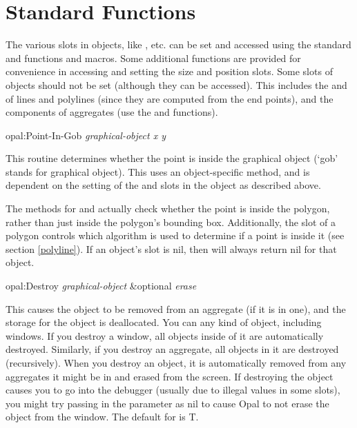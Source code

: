 \section{Standard Functions}

\label{stdfuncs}
The various slots in objects, like , etc. can be set and accessed using the standard
 and  functions and macros.  Some additional
functions are provided for convenience in accessing and setting the size
and position slots.  Some slots of objects should not be set (although they can
be accessed).  This includes the  and 
of lines and polylines (since they are computed from the end points), and
the components of aggregates (use the  and
 functions).

\vspace{1 line}
\begin{programexample}
opal:Point-In-Gob {\it graphical-object x y}\value{method}
\end{programexample}

This routine determines whether the point  is inside the
graphical object (`gob' stands for graphical object).  This uses an
object-specific method, and is dependent on the setting of the
 and  slots in the object
as described above.

The  methods for  and 
actually check whether the point is inside the polygon, rather than just
inside the polygon's bounding box.  Additionally, the 
slot of a polygon controls which algorithm is used to determine if a point
is inside it (see section \ref{polyline}).
If an object's  slot is {\sc nil}, then 
will always return {\sc nil} for that object.

\vspace{1 line}
\begin{programexample}
opal:Destroy {\it graphical-object} \&optional {\it erase}\value{method}
\end{programexample}

This causes the object to be removed from an aggregate (if it is in one),
and the storage for the object is deallocated.
You can  any kind of object, including windows.  If you destroy
a window, all objects inside of it are automatically destroyed.  Similarly,
if you destroy an aggregate, all objects in it are destroyed (recursively).
When you destroy an object, it is automatically removed from any aggregates
it might be in and erased from the screen.  If destroying the object causes
you to go into the debugger (usually due to illegal values in some slots),
you might try passing in the  parameter as {\sc nil} to cause Opal to
not erase the object from the window.  The default for  is T.

